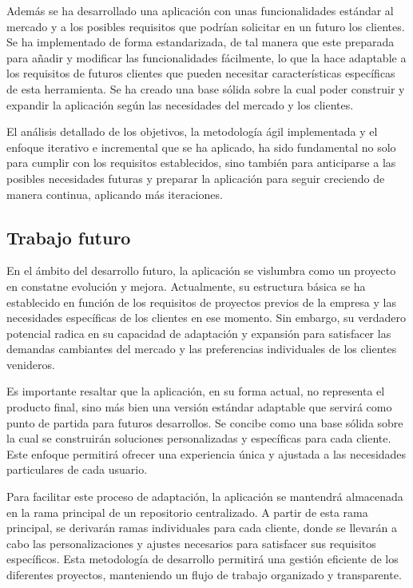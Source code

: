 \documentclass[12pt]{article}
\begin{document}
Además se ha desarrollado una aplicación con unas funcionalidades estándar al mercado y a los posibles requisitos que podrían solicitar en un futuro
los clientes. Se ha implementado de forma estandarizada, de tal manera que este preparada para añadir y modificar las funcionalidades fácilmente, lo que la hace
adaptable a los requisitos de futuros clientes que pueden necesitar características específicas de esta herramienta.
Se ha creado una base sólida sobre la cual poder construir y expandir la aplicación según las necesidades del mercado y los clientes.

El análisis detallado de los objetivos, la metodología ágil implementada y el enfoque iterativo e incremental que se ha aplicado,
ha sido fundamental no solo para cumplir con los requisitos establecidos, sino también para anticiparse a las posibles necesidades futuras y
preparar la aplicación para seguir creciendo de manera continua, aplicando más iteraciones.

\subsection{Trabajo futuro}
En el ámbito del desarrollo futuro, la aplicación se vislumbra como un proyecto en constatne evolución y mejora. Actualmente, su estructura básica se ha 
establecido en función de los requisitos de proyectos previos de la empresa y las necesidades específicas de los clientes en ese momento. Sin embargo, su 
verdadero potencial radica en su capacidad de adaptación y expansión para satisfacer las demandas cambiantes del mercado y las preferencias individuales de los 
clientes venideros.

Es importante resaltar que la aplicación, en su forma actual, no representa el producto final, sino más bien una versión estándar adaptable que servirá como punto
de partida para futuros desarrollos. Se concibe como una base sólida sobre la cual se construirán soluciones personalizadas y específicas para cada cliente. Este enfoque
permitirá ofrecer una experiencia única y ajustada a las necesidades particulares de cada usuario.

Para facilitar este proceso de adaptación, la aplicación se mantendrá almacenada en la rama principal de un repositorio centralizado. A partir de esta rama principal,
se derivarán ramas individuales para cada cliente, donde se llevarán a cabo las personalizaciones y ajustes necesarios para satisfacer sus requisitos específicos.
Esta metodología de desarrollo permitirá una gestión eficiente de los diferentes proyectos, manteniendo un flujo de trabajo organizado y transparente.
\end{document}
